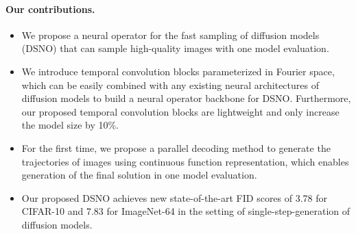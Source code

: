  \paragraph{Our contributions.}
\begin{itemize}[leftmargin=*]
    \item We propose a neural operator for the fast sampling of diffusion models (DSNO) that can sample high-quality images with one model evaluation. 
    \item We introduce temporal convolution blocks parameterized in Fourier space, which can be easily combined with any existing neural architectures of diffusion models to build a neural operator backbone for DSNO. Furthermore, our proposed temporal convolution blocks are lightweight and only increase the model size by 10\%.
    \item For the first time, we propose a parallel decoding method to generate the trajectories of images using continuous function representation, which enables generation of the final solution in one model evaluation.
    \item Our proposed DSNO achieves new state-of-the-art FID scores of 3.78 for CIFAR-10 and 7.83 for ImageNet-64 in the setting of single-step-generation of diffusion models.
\end{itemize}

